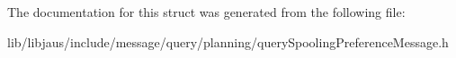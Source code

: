 \-The documentation for this struct was generated from the following file\-:\begin{DoxyCompactItemize}
\item 
lib/libjaus/include/message/query/planning/query\-Spooling\-Preference\-Message.\-h\end{DoxyCompactItemize}
